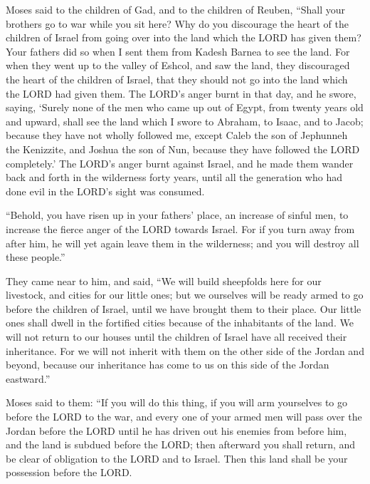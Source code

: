  Moses said to the children of Gad, and to the children of
Reuben, ``Shall your brothers go to war while you sit here?
 Why do you discourage the heart of the children of Israel
from going over into the land which the LORD has given them?
 Your fathers did so when I sent them from Kadesh Barnea
to see the land.  For when they went up to the valley of
Eshcol, and saw the land, they discouraged the heart of the children of
Israel, that they should not go into the land which the LORD had given
them.  The LORD's anger burnt in that day, and he swore,
saying,  `Surely none of the men who came up out of
Egypt, from twenty years old and upward, shall see the land which I
swore to Abraham, to Isaac, and to Jacob; because they have not wholly
followed me,  except Caleb the son of Jephunneh the
Kenizzite, and Joshua the son of Nun, because they have followed the
LORD completely.'  The LORD's anger burnt against Israel,
and he made them wander back and forth in the wilderness forty years,
until all the generation who had done evil in the LORD's sight was
consumed.

 ``Behold, you have risen up in your fathers' place, an
increase of sinful men, to increase the fierce anger of the LORD towards
Israel.  For if you turn away from after him, he will yet
again leave them in the wilderness; and you will destroy all these
people.''

 They came near to him, and said, ``We will build
sheepfolds here for our livestock, and cities for our little ones;
 but we ourselves will be ready armed to go before the
children of Israel, until we have brought them to their place. Our
little ones shall dwell in the fortified cities because of the
inhabitants of the land.  We will not return to our
houses until the children of Israel have all received their inheritance.
 For we will not inherit with them on the other side of
the Jordan and beyond, because our inheritance has come to us on this
side of the Jordan eastward.''

 Moses said to them: ``If you will do this thing, if you
will arm yourselves to go before the LORD to the war, 
and every one of your armed men will pass over the Jordan before the
LORD until he has driven out his enemies from before him,
 and the land is subdued before the LORD; then afterward
you shall return, and be clear of obligation to the LORD and to Israel.
Then this land shall be your possession before the LORD.

